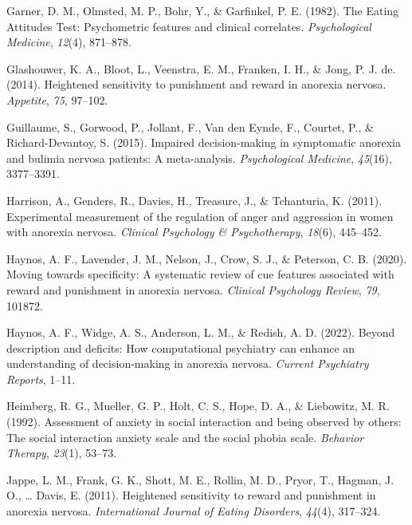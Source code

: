 \documentclass[
  man,floatsintext]{apa6}
\newlength{\cslhangindent}
\newlength{\cslentryspacingunit} %
\newenvironment{CSLReferences}[2] %
 {%
  \setlength{\parindent}{0pt}
  \ifodd #1
  \let\oldpar\par
  \def\par{\hangindent=\cslhangindent\oldpar}
  \fi
  \setlength{\parskip}{#2\cslentryspacingunit}
 }%
 {}
\begin{document}
\begin{CSLReferences}{1}{0}
\leavevmode{}%
Garner, D. M., Olmsted, M. P., Bohr, Y., \& Garfinkel, P. E. (1982). The {Eating} {Attitudes} {Test}: Psychometric features and clinical correlates. \emph{Psychological Medicine}, \emph{12}(4), 871--878.

\leavevmode{}%
Glashouwer, K. A., Bloot, L., Veenstra, E. M., Franken, I. H., \& Jong, P. J. de. (2014). Heightened sensitivity to punishment and reward in anorexia nervosa. \emph{Appetite}, \emph{75}, 97--102.

\leavevmode{}%
Guillaume, S., Gorwood, P., Jollant, F., Van den Eynde, F., Courtet, P., \& Richard-Devantoy, S. (2015). Impaired decision-making in symptomatic anorexia and bulimia nervosa patients: A meta-analysis. \emph{Psychological Medicine}, \emph{45}(16), 3377--3391.

\leavevmode{}%
Harrison, A., Genders, R., Davies, H., Treasure, J., \& Tchanturia, K. (2011). Experimental measurement of the regulation of anger and aggression in women with anorexia nervosa. \emph{Clinical Psychology \& Psychotherapy}, \emph{18}(6), 445--452.

\leavevmode{}%
Haynos, A. F., Lavender, J. M., Nelson, J., Crow, S. J., \& Peterson, C. B. (2020). Moving towards specificity: A systematic review of cue features associated with reward and punishment in anorexia nervosa. \emph{Clinical Psychology Review}, \emph{79}, 101872.

\leavevmode{}%
Haynos, A. F., Widge, A. S., Anderson, L. M., \& Redish, A. D. (2022). Beyond description and deficits: How computational psychiatry can enhance an understanding of decision-making in anorexia nervosa. \emph{Current Psychiatry Reports}, 1--11.

\leavevmode{}%
Heimberg, R. G., Mueller, G. P., Holt, C. S., Hope, D. A., \& Liebowitz, M. R. (1992). Assessment of anxiety in social interaction and being observed by others: The social interaction anxiety scale and the social phobia scale. \emph{Behavior Therapy}, \emph{23}(1), 53--73.

\leavevmode{}%
Jappe, L. M., Frank, G. K., Shott, M. E., Rollin, M. D., Pryor, T., Hagman, J. O., \ldots{} Davis, E. (2011). Heightened sensitivity to reward and punishment in anorexia nervosa. \emph{International Journal of Eating Disorders}, \emph{44}(4), 317--324.


\end{CSLReferences}
\end{document}
